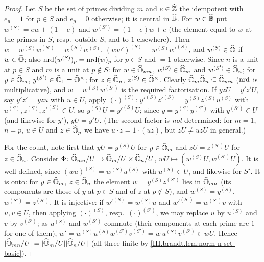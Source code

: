 \begin{lemma}
\end{lemma}
\begin{proof}
Let $S$ be the set of primes dividing $m$ and $e\in\widehat{\mathbb{Z}}$ the idempotent with $e_p=1$ for $p\in S$ and $e_p=0$ otherwise; it is central in $\widehat{\mathbb{B}}$.
For $w\in\widehat{\mathbb{B}}$ put $w^{(S)}=ew+(1-e)$ and $w^{(S')}=(1-e)w+e$ (the element equal to $w$ at the primes in $S$, resp.\ outside $S$, and to $1$
elsewhere). Then $w=w^{(S)}w^{(S')}=w^{(S')}w^{(S)}$, $(ww')^{(S)}=w^{(S)}w'^{(S)}$, and $w^{(S)}\in\widehat{\mathbb{O}}$ if $w\in\widehat{\mathbb{O}}$; also
$\operatorname{nrd}(w^{(S)})_p=\operatorname{nrd}(w)_p$ for $p\in S$ and $=1$ otherwise. Since $n$ is a unit at $p\in S$ and $m$ is a unit at $p\notin S$:
for $w\in\widehat{\mathbb{O}}_{mn}$, $w^{(S)}\in\widehat{\mathbb{O}}_m$ and $w^{(S')}\in\widehat{\mathbb{O}}_n$; for $y\in\widehat{\mathbb{O}}_m$, $y^{(S')}\in\widehat{\mathbb{O}}_1=\widehat{\mathbb{O}}^\times$; for $z\in\widehat{\mathbb{O}}_n$,
$z^{(S)}\in\widehat{\mathbb{O}}^\times$. Clearly $\widehat{\mathbb{O}}_m\widehat{\mathbb{O}}_n\subseteq\widehat{\mathbb{O}}_{mn}$ ($\operatorname{nrd}$ is multiplicative), and $w=w^{(S)}w^{(S')}$ is the required
factorisation. If $yzU=y'z'U$, say $y'z'=yzu$ with $u\in U$, apply $(\cdot)^{(S)}$: $y'^{(S)}z'^{(S)}=y^{(S)}z^{(S)}u^{(S)}$ with
$u^{(S)},z^{(S)},z'^{(S)}\in U$, so $y^{(S)}U=y'^{(S)}U$; since $y=y^{(S)}y^{(S')}$ with $y^{(S')}\in U$ (and likewise for $y'$), $yU=y'U$. (The
second factor is \emph{not} determined: for $m=1$, $n=p$, $u\in U$ and $z\in\widehat{\mathbb{O}}_p$ we have $u\cdot z=1\cdot(uz)$, but $zU\ne uzU$ in general.)

For the count, note first that $yU=y^{(S)}U$ for $y\in\widehat{\mathbb{O}}_m$ and $zU=z^{(S')}U$ for $z\in\widehat{\mathbb{O}}_n$. Consider
$\Phi\colon\widehat{\mathbb{O}}_{mn}/U\to\widehat{\mathbb{O}}_m/U\times\widehat{\mathbb{O}}_n/U$, $wU\mapsto(w^{(S)}U,w^{(S')}U)$. It is well defined, since $(wu)^{(S)}=w^{(S)}u^{(S)}$ with
$u^{(S)}\in U$, and likewise for $S'$. It is onto: for $y\in\widehat{\mathbb{O}}_m$, $z\in\widehat{\mathbb{O}}_n$ the element $w=y^{(S)}z^{(S')}$ lies in $\widehat{\mathbb{O}}_{mn}$ (its
components are those of $y$ at $p\in S$ and of $z$ at $p\notin S$), and $w^{(S)}=y^{(S)}$, $w^{(S')}=z^{(S')}$. It is injective: if
$w'^{(S)}=w^{(S)}u$ and $w'^{(S')}=w^{(S')}v$ with $u,v\in U$, then applying $(\cdot)^{(S)}$, resp.\ $(\cdot)^{(S')}$, we may replace $u$ by
$u^{(S)}$ and $v$ by $v^{(S')}$; as $u^{(S)}$ and $w^{(S')}$ commute (their components at each prime are $1$ for one of them),
$w'=w^{(S)}u^{(S)}w^{(S')}v^{(S')}=w\,u^{(S)}v^{(S')}\in wU$. Hence $\lvert\widehat{\mathbb{O}}_{mn}/U\rvert=\lvert\widehat{\mathbb{O}}_m/U\rvert\lvert\widehat{\mathbb{O}}_n/U\rvert$ (all three finite by
\cref{III.brandt.lem:norm-n-set-basic}).
\end{proof}

